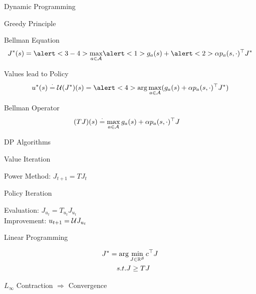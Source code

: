 \documentclass[10pt]{beamer}
\begin{document}
\begin{frame}[fragile]{Dynamic Programming}

\begin{block}{Greedy Principle}
{\color{orange}{Best = Current Best+ Future Best}}
\end{block}
\begin{block}{Bellman Equation}
\begin{align*}
J^*(s)&=\alert<3-4>{\max_{a\in \A}} \alert<1>{g_a(s)}+\alert<2>{\alpha p_a(s,\cdot)^\top J^*}\\
\end{align*}
\end{block}
\p\p\p
\vspace{-20pt}
\vspace{-20pt}
\normalsize
\begin{block}{Values lead to Policy}
\begin{align*}
u^*(s)\eqdef \U(J^*)(s) =\alert<4>{\arg\max_{a\in \A}} (g_a(s)+\alpha p_a(s,\cdot)^\top J^*)
\end{align*}
\end{block}
\normalsize
\p
\begin{block}{Bellman Operator}
\begin{align*}
(TJ)(s)&\stackrel{\cdot}{=}\max_{a\in \mathcal{A}} g_a(s)+\alpha p_a(s,\cdot)^\top J
\end{align*}
\end{block}
\normalsize

\end{frame}

\begin{frame}[fragile]{DP Algorithms}
\begin{block}{Value Iteration}
\begin{center}

Power Method: $J_{t+1}=T J_t$
\end{center}
\end{block}
\normalsize\p
\begin{block}{Policy Iteration}

\begin{center}
Evaluation: $J_{u_t}=T_{u_t} J_{u_t}$\\
Improvement: $u_{t+1}=\mathcal{U} J_{u_t}$
\end{center}
\end{block}
\normalsize\p
\begin{block}{Linear Programming}

\begin{align*}
J^*&=\arg\min_{J\in \mathbb{R}^{\mathcal{S}}} c^\top J\\
&\quad s.t. J\geq TJ
\end{align*}
\end{block}
\begin{block}{\centering $L_\infty$ Contraction $\Rightarrow$ Convergence}
\end{block}

\end{frame}
\end{document}
